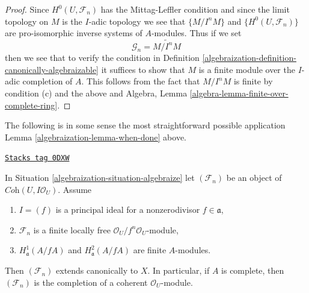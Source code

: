 \begin{proof}

Since $H^0(U, \mathcal{F}_n)$ has the Mittag-Leffler condition
and since the limit topology on $M$ is the $I$-adic topology
we see that $\{M/I^nM\}$ and $\{H^0(U, \mathcal{F}_n)\}$
are pro-isomorphic inverse systems of $A$-modules.
Thus if we set
$$
\mathcal{G}_n = \widetilde{M/I^n M}
$$
then we see that to verify the condition in
Definition \ref{algebraization-definition-canonically-algebraizable}
it suffices to show that $M$ is a finite module over the
$I$-adic completion of $A$. This follows from
the fact that $M/I^n M$ is finite by condition (c)
and the above and
Algebra, Lemma \ref{algebra-lemma-finite-over-complete-ring}.
\end{proof}

The following is in some sense the most straightforward possible application
Lemma \ref{algebraization-lemma-when-done} above.

\begin{lemma}
\label{algebraization-lemma-algebraization-principal-variant}
\href{https://stacks.math.columbia.edu/tag/0DXW}{\texttt{Stacks tag 0DXW}}

In Situation \ref{algebraization-situation-algebraize} let
$(\mathcal{F}_n)$ be an object of $\textit{Coh}(U, I\mathcal{O}_U)$.
Assume
\begin{enumerate}
\item $I = (f)$ is a principal ideal for a nonzerodivisor $f \in \mathfrak a$,
\item $\mathcal{F}_n$ is a finite locally free
$\mathcal{O}_U/f^n\mathcal{O}_U$-module,
\item $H^1_\mathfrak a(A/fA)$ and $H^2_\mathfrak a(A/fA)$
are finite $A$-modules.
\end{enumerate}
Then $(\mathcal{F}_n)$ extends canonically to $X$. In particular, if $A$
is complete, then $(\mathcal{F}_n)$ is the completion of a coherent
$\mathcal{O}_U$-module.
\end{lemma}

